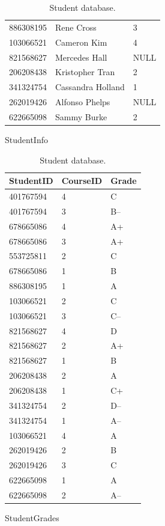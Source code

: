 \begin{problem}
\begin{table}[H]
\begin{subtable}{0.55\textwidth}
\begin{subtable}{\textwidth}
\begin{tabular}{|l|l|l|}
            886308195 & Rene Cross & 3 \\
            103066521 & Cameron Kim & 4 \\
            821568627 & Mercedes Hall & NULL \\
            206208438 & Kristopher Tran & 2 \\
            341324754 & Cassandra Holland & 1 \\
            262019426 & Alfonso Phelps & NULL \\
            622665098 & Sammy Burke & 2 \\ \hline
        \end{tabular}
        \caption{StudentInfo}
        \label{table:sql1-student-info}
    \end{subtable}
\end{subtable}
\hfil
\begin{subtable}{.35\textwidth}
    \centering
    \footnotesize
    \begin{tabular}{|l|l|l|}
        \hline StudentID & CourseID & Grade \\ \hline
        401767594 & 4 & C \\
        401767594 & 3 & B-- \\
        678665086 & 4 & A+ \\
        678665086 & 3 & A+ \\
        553725811 & 2 & C \\
        678665086 & 1 & B \\
        886308195 & 1 & A \\
        103066521 & 2 & C \\
        103066521 & 3 & C-- \\
        821568627 & 4 & D \\
        821568627 & 2 & A+ \\
        821568627 & 1 & B \\
        206208438 & 2 & A \\
        206208438 & 1 & C+ \\
        341324754 & 2 & D-- \\
        341324754 & 1 & A-- \\
        103066521 & 4 & A \\
        262019426 & 2 & B \\
        262019426 & 3 & C \\
        622665098 & 1 & A \\
        622665098 & 2 & A-- \\ \hline
    \end{tabular}
    \caption{StudentGrades}
    \label{table:sql1-student-grades}
\end{subtable}
\caption{Student database.}
\end{table}


\end{problem}
